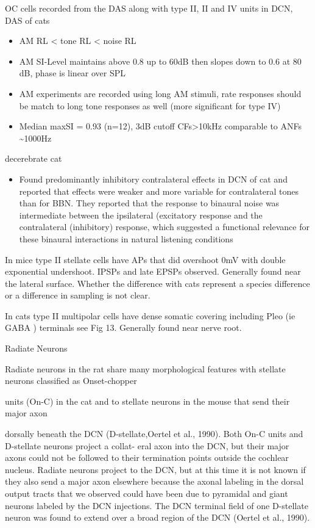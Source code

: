 \documentclass[10pt,a4paper]{article}
\begin{document}
\citep{JorisSmith:1998} OC cells recorded from the DAS along with type II, II
and IV units in DCN, DAS of cats


\begin{itemize}
\item AM RL {\textless} tone RL {\textless} noise RL
\item AM SI-Level maintains above 0.8 up to 60dB then slopes down to 0.6 at 80
  dB, phase is linear over SPL
\item AM experiments are recorded using long AM stimuli, rate responses should
  be match to long tone responses as well (more significant for type IV)
\item Median maxSI = 0.93 (n=12), 3dB cutoff CFs{\textgreater}10kHz comparable
  to ANFs \~{}1000Hz
\end{itemize}
\citep{YoungBrownell:1976} decerebrate cat


\begin{itemize}
\item Found predominantly inhibitory contralateral effects in DCN of cat and
  reported that effects were weaker and more variable for contralateral tones
  than for BBN.  They reported that the response to binaural noise was
  intermediate between the ipsilateral (excitatory response and the
  contralateral (inhibitory) response, which suggested a functional relevance
  for these binaural interactions in natural listening conditions
\end{itemize}
In mice \citep{OertelWuEtAl:1990} type II stellate cells have APs that did
overshoot 0mV with double exponential undershoot. IPSPs and late EPSPs
observed. Generally found near the lateral surface. Whether the difference with
cats represent a species difference or a difference in sampling is not clear.

In cats type II multipolar cells \citep{Cant:1981} have dense somatic covering
including Pleo (ie GABA ) terminals see Fig 13.  Generally found near nerve
root.

\citep{DoucetRyugo:1997} Radiate Neurons

Radiate neurons in the rat share many morphological features with stellate
neurons classified as Onset-chopper

units (On-C) in the cat \citep{SmithRhode:1989} and to stellate neurons in the
mouse that send their major axon

dorsally beneath the DCN (D-stellate,Oertel et al., 1990). Both On-C units and
D-stellate neurons project a collat- eral axon into the DCN, but their major
axons could not be followed to their termination points outside the cochlear
nucleus. Radiate neurons project to the DCN, but at this time it is not known if
they also send a major axon elsewhere because the axonal labeling in the dorsal
output tracts that we observed could have been due to pyramidal and giant
neurons labeled by the DCN injections. The DCN terminal field of one D-stellate
neuron was found to extend over a broad region of the DCN (Oertel et al., 1990).
\end{document}
